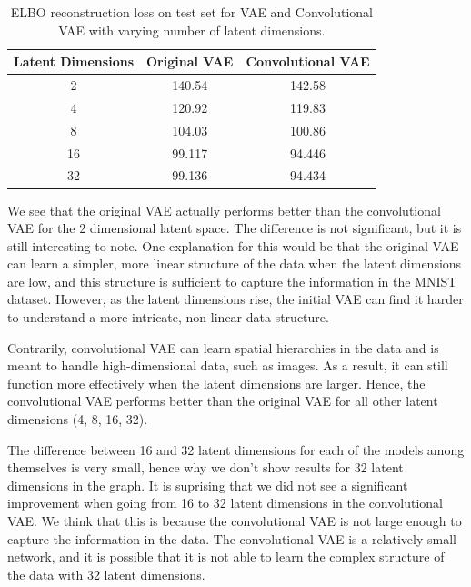 \begin{table}
\centering
\begin{tabular}{|c|c|c|}
\hline
\multicolumn{1}{|c|}{\textbf{Latent Dimensions}} & \multicolumn{1}{c|}{\textbf{Original VAE}} & \multicolumn{1}{c|}{\textbf{Convolutional VAE}} \\ \hline
\multicolumn{1}{|c|}{2} & \multicolumn{1}{c|}{140.54} & \multicolumn{1}{c|}{142.58}  \\ \hline
\multicolumn{1}{|c|}{4} & \multicolumn{1}{c|}{120.92} & \multicolumn{1}{c|}{119.83}  \\ \hline
\multicolumn{1}{|c|}{8} & \multicolumn{1}{c|}{104.03} & \multicolumn{1}{c|}{100.86}  \\ \hline
\multicolumn{1}{|c|}{16} & \multicolumn{1}{c|}{99.117} & \multicolumn{1}{c|}{94.446}  \\ \hline
\multicolumn{1}{|c|}{32} & \multicolumn{1}{c|}{99.136} & \multicolumn{1}{c|}{94.434}  \\ \hline
\end{tabular}
\vspace*{0.5cm}
\caption{ELBO reconstruction loss on test set for VAE and Convolutional VAE with varying number of latent dimensions.}
\label{tab:vaeloss}
\end{table}

We see that the original VAE actually performs better than the convolutional VAE for the 2 dimensional latent space. The difference is not significant, but it is still interesting to note. One explanation for this would be that the original VAE can learn a simpler, more linear structure of the data when the latent dimensions are low, and this structure is sufficient to capture the information in the MNIST dataset. However, as the latent dimensions rise, the initial VAE can find it harder to understand a more intricate, non-linear data structure.

Contrarily, convolutional VAE can learn spatial hierarchies in the data and is meant to handle high-dimensional data, such as images. As a result, it can still function more effectively when the latent dimensions are larger. Hence, the convolutional VAE performs better than the original VAE for all other latent dimensions (4, 8, 16, 32).

The difference between 16 and 32 latent dimensions for each of the models among themselves is very small, hence why we don't show results for 32 latent dimensions in the graph. It is suprising that we did not see a significant improvement when going from 16 to 32 latent dimensions in the convolutional VAE. We think that this is because the convolutional VAE is not large enough to capture the information in the data. The convolutional VAE is a relatively small network, and it is possible that it is not able to learn the complex structure of the data with 32 latent dimensions.

